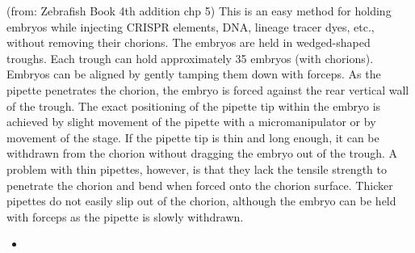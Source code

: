 \documentclass[
  letterpaper,
  DIV=11,
  numbers=noendperiod]{scrreprt}
\providecommand{\tightlist}{%
  \setlength{\itemsep}{0pt}\setlength{\parskip}{0pt}}\usepackage{longtable,booktabs,array}
\begin{document}
\begin{tcolorbox}[enhanced jigsaw, rightrule=.15mm, title=\textcolor{quarto-callout-note-color}{\faInfo}\hspace{0.5em}{background}, titlerule=0mm, opacitybacktitle=0.6, toprule=.15mm, bottomrule=.15mm, opacityback=0, left=2mm, colframe=quarto-callout-note-color-frame, breakable, coltitle=black, colback=white, colbacktitle=quarto-callout-note-color!10!white, bottomtitle=1mm, leftrule=.75mm, toptitle=1mm, arc=.35mm]

(from: Zebrafish Book 4th addition chp 5) This is an easy method for
holding embryos while injecting CRISPR elements, DNA, lineage tracer
dyes, etc., without removing their chorions. The embryos are held in
wedged-shaped troughs. Each trough can hold approximately 35 embryos
(with chorions). Embryos can be aligned by gently tamping them down with
forceps. As the pipette penetrates the chorion, the embryo is forced
against the rear vertical wall of the trough. The exact positioning of
the pipette tip within the embryo is achieved by slight movement of the
pipette with a micromanipulator or by movement of the stage. If the
pipette tip is thin and long enough, it can be withdrawn from the
chorion without dragging the embryo out of the trough. A problem with
thin pipettes, however, is that they lack the tensile strength to
penetrate the chorion and bend when forced onto the chorion surface.
Thicker pipettes do not easily slip out of the chorion, although the
embryo can be held with forceps as the pipette is slowly withdrawn.

\end{tcolorbox}

\begin{itemize}
\tightlist
\item
\end{itemize}
\end{document}
